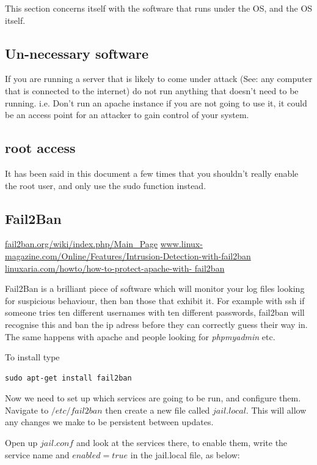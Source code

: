 This section concerns itself with the software that runs under the OS, and the OS itself.

\subsection{Un-necessary software}

If you are running a server that is likely to come under attack (See: any computer that is connected to the internet) do not run anything that doesn't need to be running.  i.e. Don't run an apache instance if you are not going to use it, it could be an access point for an attacker to gain control of your system.

\subsection{root access}

It has been said in this document a few times that you shouldn't really enable the root user, and only use the sudo function instead.

\subsection{Fail2Ban}

\url{fail2ban.org/wiki/index.php/Main_Page}
\url{www.linux-magazine.com/Online/Features/Intrusion-Detection-with-fail2ban}
\url{linuxaria.com/howto/how-to-protect-apache-with-
fail2ban}

Fail2Ban is a brilliant piece of software which will monitor your log files looking for suspicious behaviour, then ban those that exhibit it.  For example with ssh if someone tries ten different usernames with ten different passwords, fail2ban will recognise this and ban the ip adress before they can correctly guess their way in.  The same happens with apache and people looking for \textit{phpmyadmin} etc.

To install type

\begin{lstlisting}
sudo apt-get install fail2ban
\end{lstlisting}

Now we need to set up which services are going to be run, and configure them.  Navigate to $/etc/fail2ban$ then create a new file called $jail.local$.  This will allow any changes we make to be persistent between updates.

Open up $jail.conf$ and look at the services there, to enable them, write the service name and $enabled = true$ in the jail.local file, as below:


